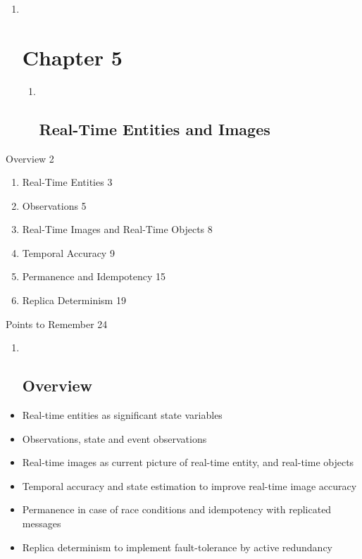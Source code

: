 \begin{enumerate}
\item ~
  \section{Chapter 5}\label{chapter-5}

  \begin{enumerate}
  \item ~
    \subsection{Real-Time Entities and
    Images}\label{real-time-entities-and-images}
  \end{enumerate}
\end{enumerate}

Overview 2

\begin{enumerate}
\def\labelenumi{\arabic{enumi}.}
\item
  Real-Time Entities 3
\item
  Observations 5
\item
  Real-Time Images and Real-Time Objects 8
\item
  Temporal Accuracy 9
\item
  Permanence and Idempotency 15
\item
  Replica Determinism 19
\end{enumerate}

Points to Remember 24

\begin{enumerate}
\item ~
  \subsection{}\label{section}

  \subsection{Overview}\label{overview}
\end{enumerate}

\begin{itemize}
\item
  Real-time entities as significant state variables
\item
  Observations, state and event observations
\item
  Real-time images as current picture of real-time entity, and real-time
  objects
\item
  Temporal accuracy and state estimation to improve real-time image
  accuracy
\item
  Permanence in case of race conditions and idempotency with replicated
  messages
\item
  Replica determinism to implement fault-tolerance by active redundancy
\end{itemize}


